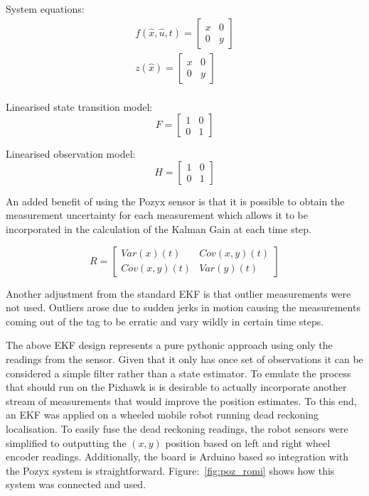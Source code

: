 System equations:
\begin{equation*}
    \begin{split}
        f(\hat{x},\hat{u},t) = \left[ \begin{array}{cc}
                              x & 0\\
                              0 & y
        \end{array} \right]\\
        z(\hat{x}) = \left[ \begin{array}{cc}
                              x & 0\\
                              0 & y
        \end{array} \right]\\
    \end{split}
\end{equation*}


Linearised state transition model:
\[
    F =
    \left[ \begin{array}{cc}
    1 & 0\\
    0 & 1
    \end{array}
    \right]
\]

Linearised observation model:
\[
    H =
    \left[ \begin{array}{cc}
    1 & 0\\
    0 & 1
    \end{array}
    \right]
\]

An added benefit of using the Pozyx sensor is that it is possible to obtain the measurement uncertainty for each measurement which allows it to be incorporated in the calculation of the Kalman Gain at each time step.

\[
    R =
%
        \left[
            \begin{array}{cc}
                Var(x)(t) & Cov(x,y)(t)\\
                Cov(x,y)(t) & Var(y)(t)
            \end{array}
        \right]
\]

Another adjustment from the standard EKF is that outlier measurements were not used.
Outliers arose due to sudden jerks in motion causing the measurements coming out of the tag to be erratic and vary wildly in certain time steps.

The above EKF design represents a pure pythonic approach using only the readings from the sensor.
Given that it only has once set of observations it can be considered a simple filter rather than a state estimator.
To emulate the process that should run on the Pixhawk is is desirable to actually incorporate another stream of measurements that would improve the position estimates.
To this end, an EKF was applied on a wheeled mobile robot running dead reckoning localisation.
To easily fuse the dead reckoning readings, the robot sensors were simplified to outputting the $(x,y)$ position based on left and right wheel encoder readings.
Additionally, the board is Arduino based so integration with the Pozyx system is straightforward.
Figure:~\ref{fig:poz_romi} shows how this system was connected and used.

